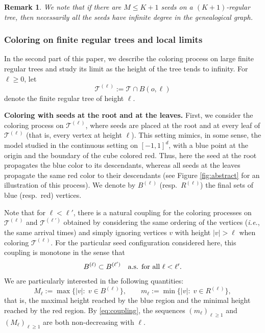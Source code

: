 \documentclass[french]{article}
\newtheorem{remark}[theorem]{Remark}
\newcommand{\T}{\mathcal{T}}
\renewcommand{\1}{\mathds{1}}
\begin{document}
\begin{remark} 
We note that if there are $M\le K+1$ seeds on a $(K+1)$-regular tree, then necessarily all the seeds have infinite degree in the genealogical graph. 
\end{remark}

\subsubsection{Coloring on finite regular trees and local limits}


In the second part of this paper, we describe the coloring process on large finite regular trees and study its limit as the height of the tree tends to infinity. For $\ell \geq 0$, let
$$
\T^{(\ell)} := \T \cap B(o,\ell)
$$
denote the finite regular tree of height $\ell$.

\medskip

\noindent\textbf{Coloring with seeds at the root and at the leaves.}
First, we consider the coloring process on $\T^{(\ell)}$, where seeds are placed at the root and at every leaf of $\T^{(\ell)}$ (that is, every vertex at height $\ell$). This setting mimics, in some sense, the model studied in the continuous setting on $[-1,1]^d$, with a blue point at the origin and the boundary of the cube colored red. Thus, here the seed at the root propagates the blue color to its descendants, whereas all seeds at the leaves propagate the same red color to their descendants (see Figure \ref{fig:abstract} for an illustration of this process). We denote by $B^{(\ell)}$ (resp.\ $R^{(\ell)}$) the final sets of blue (resp.\ red) vertices.

\medskip

Note that for $\ell<\ell'$, there is a natural coupling for the coloring processes on $\T^{(\ell)}$ and $\T^{(\ell')}$ obtained by considering the same ordering of the vertices (\emph{i.e.}, the same arrival times) and simply ignoring vertices $v$ with height $|v| > \ell$ when coloring $\T^{(\ell)}$. For the particular seed configuration considered here, this coupling is monotone in the sense that
\begin{eqnarray}\label{eq:coupling}
B^{(\ell)}\subset B^{(\ell')}\quad \hbox{a.s. for all $\ell<\ell'$.}    
\end{eqnarray}
We are particularly interested in the following quantities:
\begin{equation}\label{eq:M_N_m_n}
    M_{\ell}:=\max\{|v|:\; v\in B^{(\ell)}\},
\qquad
m_{\ell}:=\min\{|v|:\; v\in R^{(\ell)}\},
\end{equation}
that is, the maximal height reached by the blue region and the minimal height reached by the red region. By \eqref{eq:coupling}, the sequences $(m_\ell)_{\ell\ge 1}$ and $(M_\ell)_{\ell\ge 1}$ are both non-decreasing with $\ell$.
\end{document}
